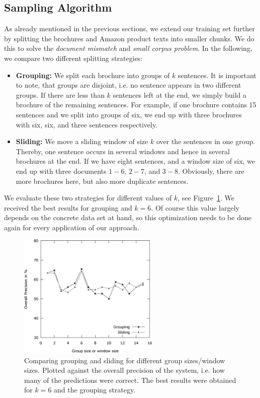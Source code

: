 \subsection{Sampling Algorithm}
As already mentioned in the previous sections, we extend our training set further by splitting the brochures and Amazon product texts into smaller chunks.
We do this to solve the \emph{document mismatch} and \emph{small corpus problem}.
In the following, we compare two different splitting strategies:
\begin{itemize}
	\item
		\textbf{Grouping:}
		We split each brochure into groups of $k$ sentences.
		It is important to note, that groups are disjoint, i.e. no sentence appears in two different groups.
		If there are less than $k$ sentences left at the end, we simply build a brochure of the remaining sentences.
		For example, if one brochure contains 15 sentences and we split into groups of six, we end up with three brochures with six, six, and three sentences respectively.
	\item
		\textbf{Sliding:}
		We move a sliding window of size $k$ over the sentences in one group.
		Thereby, one sentence occurs in several windows and hence in several brochures at the end.
		If we have eight sentences, and a window size of six, we end up with three documents $1 - 6$, $2 - 7$, and $3 - 8$.
		Obviously, there are more brochures here, but also more duplicate sentences.
\end{itemize}

We evaluate these two strategies for different values of $k$, see Figure~\ref{fig:sampling_optimization}.
We received the best results for grouping and $k = 6$.
Of course this value largely depends on the concrete data set at hand, so this optimization needs to be done again for every application of our \nto approach.

\begin{figure}
	\begin{center}
		\includegraphics[width=0.6\textwidth]{figures/sampling_optimization.eps}
	\end{center}
	\caption{Comparing grouping and sliding for different group sizes/window sizes. Plotted against the overall precision of the system, i.e. how many of the predictions were correct. The best results were obtained for $k = 6$ and the grouping strategy.}
	\label{fig:sampling_optimization}
\end{figure}
